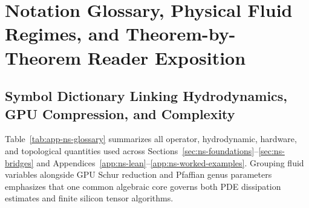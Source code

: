 \documentclass[10pt]{article}
\renewcommand{\_}{\OrigUnderscore\hspace{0pt}}
\numberwithin{equation}{section}
\begin{document}
\section{Notation Glossary, Physical Fluid Regimes, and Theorem-by-Theorem Reader Exposition}\label{app:ns-glossary-guide}

\subsection{Symbol Dictionary Linking Hydrodynamics, GPU Compression, and Complexity}\label{subsec:app-ns-notation}

Table~\ref{tab:app-ns-glossary} summarizes all operator, hydrodynamic, hardware, and topological quantities used across Sections~\ref{sec:ns-foundations}--\ref{sec:ns-bridges} and Appendices~\ref{app:ns-lean}--\ref{app:ns-worked-examples}. Grouping fluid variables alongside GPU Schur reduction and Pfaffian genus parameters emphasizes that one common algebraic core governs both PDE dissipation estimates and finite silicon tensor algorithms.
\end{document}
